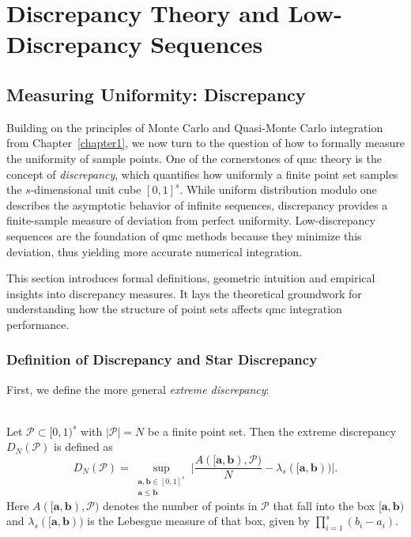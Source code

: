 \chapter{Discrepancy Theory and Low-Discrepancy Sequences}
\label{chapter2}

\section{Measuring Uniformity: Discrepancy}

Building on the principles of Monte Carlo and Quasi-Monte Carlo integration from
Chapter~\ref{chapter1}, we now turn to the question of how to formally measure
the uniformity of sample points. One of the cornerstones of \ac{qmc} theory is
the concept of \emph{discrepancy}, which quantifies how uniformly a finite point
set samples the $s$-dimensional unit cube $[0,1]^s$. While uniform distribution
modulo one describes the asymptotic behavior of infinite sequences, discrepancy
provides a finite-sample measure of deviation from perfect uniformity.
Low-discrepancy sequences are the foundation of \ac{qmc} methods because they
minimize this deviation, thus yielding more accurate numerical integration.

This section introduces formal definitions, geometric intuition and empirical
insights into discrepancy measures. It lays the theoretical groundwork for
understanding how the structure of point sets affects \ac{qmc} integration
performance.

\subsection{Definition of Discrepancy and Star Discrepancy}

First, we define the more general \emph{extreme discrepancy}:

\begin{definition} \ \\
Let $\mathcal{P}\subset [0,1)^s$ with $|\mathcal{P}| = N$ be a finite point set.
Then the extreme discrepancy $D_N(\mathcal{P})$ is defined as
\begin{equation*}
    D_N(\mathcal{P}) = \sup\limits_{\substack{\boldsymbol{a,b} \in [0,1]^s \\ \boldsymbol{a} \leq \boldsymbol{b}}} \bigg| \frac{A([\boldsymbol{a},\boldsymbol{b}) , \mathcal{P})}{N} - \lambda_s([\boldsymbol{a},\boldsymbol{b})) \bigg|.
\end{equation*}
Here $A([\boldsymbol{a},\boldsymbol{b}), \mathcal{P})$ denotes the number of
points in $\mathcal{P}$ that fall into the box
$[\boldsymbol{a},\boldsymbol{b})$ and
$\lambda_s([\boldsymbol{a},\boldsymbol{b}))$ is the Lebesgue measure of that
box, given by $\prod_{i=1}^{s} (b_i - a_i)$.
\end{definition}

